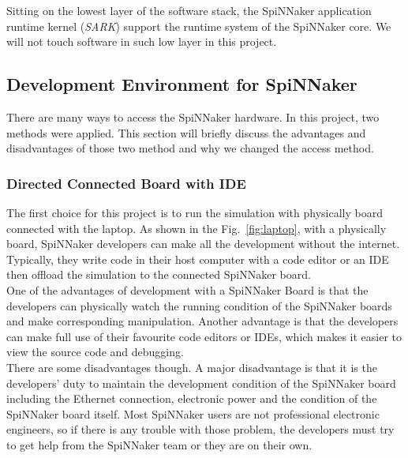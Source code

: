 Sitting on the lowest layer of the software stack, the SpiNNaker application runtime kernel (\textit{SARK}) support the runtime system of the SpiNNaker core. We will not touch software in such low layer in this project.\\


\subsection{Development Environment for SpiNNaker} \label{sec:impl}
There are many ways to access the SpiNNaker hardware. In this project, two methods were applied. This section will briefly discuss the advantages and disadvantages of those two method and why we changed the access method.\\

\subsubsection{Directed Connected Board with IDE}
The first choice for this project is to run the simulation with physically board connected with the laptop. As shown in the Fig.~\ref{fig:laptop}, with a physically board, SpiNNaker developers can make all the development without the internet. Typically, they write code in their host computer with a code editor or an IDE then offload the simulation to the connected SpiNNaker board.\\

One of the advantages of development with a SpiNNaker Board is that the developers can physically watch the running condition of the SpiNNaker boards and make corresponding manipulation. Another advantage is that the developers can make full use of their favourite code editors or IDEs, which makes it easier to view the source code and debugging.\\

There are some disadvantages though. A major disadvantage is that it is the developers' duty to maintain the development condition of the SpiNNaker board including the Ethernet connection, electronic power and the condition of the SpiNNaker board itself. Most SpiNNaker users are not professional electronic engineers, so if there is any trouble with those problem, the developers must try to get help from the SpiNNaker team or they are on their own. \\

